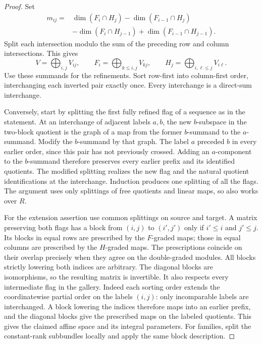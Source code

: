 \begin{proof}
Set
\begin{align*}
m_{ij}={}&\dim(F_i\cap H_j)-\dim(F_{i-1}\cap H_j)\\
 &-\dim(F_i\cap H_{j-1})+\dim(F_{i-1}\cap H_{j-1}).
\end{align*}
Split each intersection modulo the sum of the preceding row and column
intersections.  This gives
\[
 V=\bigoplus_{i,j}V_{ij},\qquad
 F_i=\bigoplus_{k\leq i,j}V_{kj},\qquad
 H_j=\bigoplus_{i,\ell\leq j}V_{i\ell}.
\]
Use these summands for the refinements.  Sort row-first into
column-first order, interchanging each inverted pair exactly once.
Every interchange is a direct-sum interchange.

Conversely, start by splitting the first fully refined flag of a
sequence as in the statement.  At an interchange of adjacent labels
$a,b$, the new $b$-subspace in the two-block quotient is the graph of
a map from the former $b$-summand to the $a$-summand.  Modify the
$b$-summand by that graph.  The label $a$ preceded $b$ in every earlier
order, since this pair has not previously crossed.  Adding an
$a$-component to the $b$-summand therefore preserves every earlier
prefix and its identified quotients.  The modified splitting realizes
the new flag and the natural quotient identifications at the
interchange.  Induction produces one splitting of all the flags.
The argument uses only splittings of free quotients and linear maps,
so also works over $R$.

For the extension assertion use common splittings on source and target.
A matrix preserving both flags has a block from $(i,j)$ to $(i',j')$
only if $i'\leq i$ and $j'\leq j$.  Its blocks in equal rows are
prescribed by the $F$-graded maps; those in equal columns are prescribed
by the $H$-graded maps.  The prescriptions coincide on their overlap
precisely when they agree on the double-graded modules.  All blocks
strictly lowering both indices are arbitrary.  The diagonal blocks
are isomorphisms, so the resulting matrix is invertible.  It also
respects every intermediate flag in the gallery.  Indeed each sorting
order extends the coordinatewise partial order on the labels $(i,j)$:
only incomparable labels are interchanged.  A block lowering the
indices therefore maps into an earlier prefix, and the diagonal blocks
give the prescribed maps on the labeled quotients.  This gives
the claimed affine space and its integral parameters.  For families,
split the constant-rank subbundles locally and apply the same block
description.
\end{proof}

